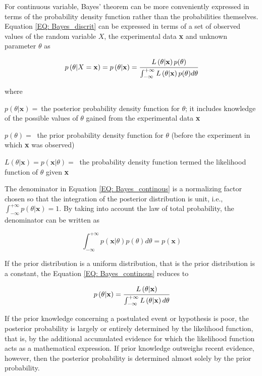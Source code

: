\documentclass[../Parameter_fitting.tex]{subfiles}
\begin{document}
For continuous variable, Bayes' theorem can be more conveniently expressed in terms of the probability density function rather than the probabilities themselves. Equation \ref{EQ: Bayes_discrit} can be expressed in terms of a set of observed values of the random variable $X$, the experimental data \textbf{x} and unknown parameter $\theta$ as

{\footnotesize
	\begin{equation} \label{EQ: Bayes_continous}
		p\left( \theta|X=\textbf{x} \right) = p\left( \theta|\textbf{x} \right) = \cfrac{L\left( \theta|\textbf{x} \right) p(\theta)}{\int_{-\infty}^{+\infty} L\left( \theta|\textbf{x} \right) p(\theta) d\theta}
\end{equation} }

where

$p(\theta|\textbf{x}) = ~$the posterior probability density function for $\theta$; it includes knowledge of the possible values of $\theta$ gained from the experimental data \textbf{x}

$p(\theta) = ~$ the prior probability density function for $\theta$ (before the experiment in which \textbf{x} was observed)

$L\left( \theta|\textbf{x} \right) = p\left( \textbf{x}|\theta \right) = ~$ the probability density function termed the likelihood function of $\theta$ given \textbf{x}

The denominator in Equation \ref{EQ: Bayes_continous} is a normalizing factor chosen so that the integration of the posterior distribution is unit, i.e., $\int_{-\infty}^{+\infty} p\left( \theta|\textbf{x} \right) = 1$. By taking into account the law of total probability, the denominator can be written as

{\footnotesize
	\begin{equation}
		\int_{-\infty}^{+\infty} p\left( \textbf{x}|\theta \right) p(\theta) d\theta = p(\textbf{x})
\end{equation} }

If the prior distribution is a uniform distribution, that is the prior distribution is a constant, the Equation \ref{EQ: Bayes_continous} reduces to 

{\footnotesize
	\begin{equation}
		p\left( \theta|\textbf{x} \right) = \cfrac{L\left( \theta|\textbf{x} \right)}{\int_{-\infty}^{+\infty} L\left( \theta|\textbf{x}\right) d\theta}
\end{equation} }

If the prior knowledge concerning a postulated event or hypothesis is poor, the posterior probability is largely or entirely determined by the likelihood function, that is, by the additional accumulated evidence for which the likelihood function acts as a mathematical expression. If prior knowledge outweighs recent evidence, however, then the posterior probability is determined almost solely by the prior probability.
\end{document}

